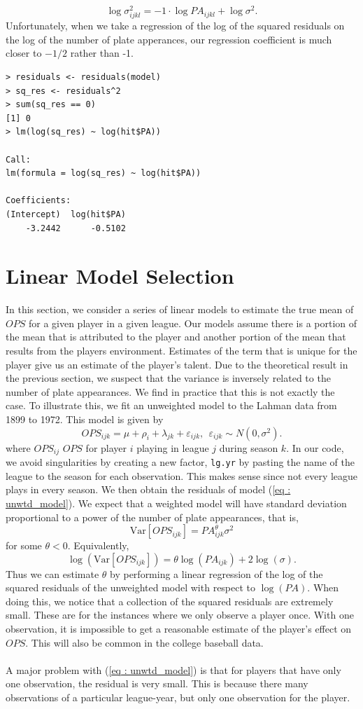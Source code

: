 \documentclass [52pt] {article}
\newcommand{\var}{\text{Var}}
\begin{document}
\[\log\sigma^2_{ijkl} = -1\cdot \log PA_{ijkl} + \log\sigma^2.\]
Unfortunately, when we take a regression of the log of the squared residuals on the log of the number of plate apperances, our regression coefficient is much closer to $-1/2$ rather than -1.
\begin{verbatim}
> residuals <- residuals(model)
> sq_res <- residuals^2
> sum(sq_res == 0)
[1] 0
> lm(log(sq_res) ~ log(hit$PA))

Call:
lm(formula = log(sq_res) ~ log(hit$PA))

Coefficients:
(Intercept)  log(hit$PA)  
    -3.2442      -0.5102
   \end{verbatim}

\section{Linear Model Selection}\label{sec : model_select1}
In this section, we consider a series of linear models to estimate the true mean of $OPS$ for a given player in a given league.  Our models assume there is a portion of the mean that is attributed to the player and another portion of the mean that results from the players environment.  Estimates of the term that is unique for the player give us an estimate of the player's talent.  Due to the theoretical result in the previous section, we suspect that the variance is inversely related to the number of plate appearances.  We find in practice that this is not exactly the case.  To illustrate this, we fit an unweighted model to the Lahman data from 1899 to 1972.  This model is given by
\begin{equation}\label{eq : unwtd_model}
OPS_{ijk} = \mu+\rho_i+\lambda_{jk} +\varepsilon_{ijk}, \:\:\varepsilon_{ijk}\sim N(0, \sigma^2).
\end{equation}
where $OPS_{ij}$ $OPS$ for player $i$ playing in league $j$ during season $k$.  In our code, we avoid singularities by creating a new factor, \verb|lg.yr| by pasting the name of the league to the season for each observation.  This makes sense since not every league plays in every season.  We then obtain the residuals of model (\ref{eq : unwtd_model}).  We expect that a weighted model will have standard deviation proportional to a power of the number of plate appearances, that is, 
\[\var[OPS_{ijk}] = PA_{ijk}^{\theta}\sigma^2\]
for some $\theta <0$.  Equivalently, 
\[\log(\text{Var}[OPS_{ijk}]) = {\theta}\log(PA_{ijk}) + 2\log(\sigma).\]
Thus we can estimate $\theta$ by performing a linear regression of the log of the squared residuals of the unweighted model with respect to $\log(PA)$.  When doing this, we notice that a collection of the squared residuals are extremely small.  These are for the instances where we only observe a player once.  With one observation, it is impossible to get a reasonable estimate of the player's effect on $OPS$.  This will also be common in the college baseball data.
\\\\
A major problem with (\ref{eq : unwtd_model}) is that for players that have only one observation, the residual is very small.  This is because there many observations of a particular league-year, but only one observation for the player.
\end{document}
